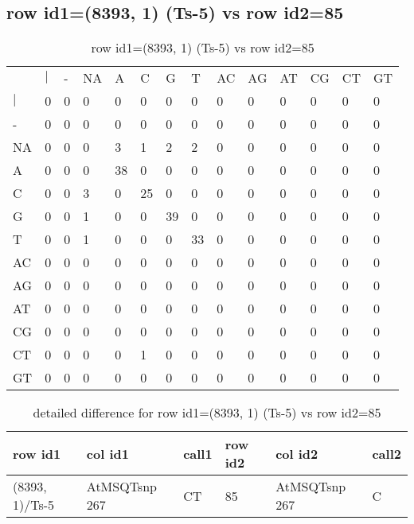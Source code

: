 \subsection{row id1=(8393, 1) (Ts-5) vs row id2=85}
\begin{center}
\begin{longtable}{|l|l|l|l|l|l|l|l|l|l|l|l|l|l|}
\caption{row id1=(8393, 1) (Ts-5) vs row id2=85} \label{table_dm446}\\
\hline
\\
\hline
&$|$&-&NA&A&C&G&T&AC&AG&AT&CG&CT&GT\\
$|$&0&0&0&0&0&0&0&0&0&0&0&0&0\\
-&0&0&0&0&0&0&0&0&0&0&0&0&0\\
NA&0&0&0&3&1&2&2&0&0&0&0&0&0\\
A&0&0&0&38&0&0&0&0&0&0&0&0&0\\
C&0&0&3&0&25&0&0&0&0&0&0&0&0\\
G&0&0&1&0&0&39&0&0&0&0&0&0&0\\
T&0&0&1&0&0&0&33&0&0&0&0&0&0\\
AC&0&0&0&0&0&0&0&0&0&0&0&0&0\\
AG&0&0&0&0&0&0&0&0&0&0&0&0&0\\
AT&0&0&0&0&0&0&0&0&0&0&0&0&0\\
CG&0&0&0&0&0&0&0&0&0&0&0&0&0\\
CT&0&0&0&0&1&0&0&0&0&0&0&0&0\\
GT&0&0&0&0&0&0&0&0&0&0&0&0&0\\
\hline
\end{longtable}
\end{center}

\begin{center}
\begin{longtable}{|l|l|l|l|l|l|}
\caption{detailed difference for row id1=(8393, 1) (Ts-5) vs row id2=85} \label{table_dm447}\\
\hline
row id1&col id1&call1&row id2&col id2&call2\\
\hline
(8393, 1)/Ts-5&AtMSQTsnp 267&CT&85&AtMSQTsnp 267&C\\
\hline
\end{longtable}
\end{center}

